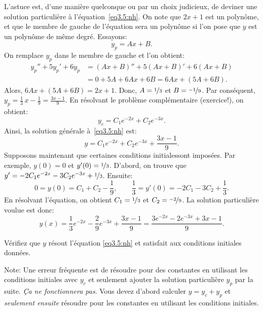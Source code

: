 L'astuce est, d'une manière quelconque ou par un choix judicieux, de deviner une solution particulière à 
l'équation~\eqref{eq3.5:nh}.  
On note que $2x+1$ est un polynôme, et que le membre de gauche de l'équation sera un polynôme si l'on pose que $y$ est un polynôme de même degré. Essayons: 
\begin{equation*}
	y_p = Ax + B .
\end{equation*}
On remplace $y_p$ dans le membre de gauche et l'on obtient: 
\begin{align*}
	y_p'' + 5y_p'+ 6y_p & = (Ax+B)'' + 5(Ax+B)' + 6(Ax+B) \\
						& = 0 + 5A + 6Ax + 6B = 6Ax+ (5A+6B) .
\end{align*}
Alors, $6Ax+(5A+6B) = 2x+1$.  
Donc, $A = \nicefrac{1}{3}$ et $B = \nicefrac{-1}{9}$.
Par conséquent, $y_p = \frac{1}{3}\, x - \frac{1}{9} = \frac{3x-1}{9}$.
En résolvant le problème complémentaire (exercice!), on obtient: 
\begin{equation*}
	y_c = C_1 e^{-2x} + C_2 e^{-3x}.
\end{equation*}
Ainsi, la solution générale à~\eqref{eq3.5:nh} est: 
\begin{equation*}
	y = C_1 e^{-2x} + C_2 e^{-3x} + \frac{3x-1}{9} .
\end{equation*}
Supposons maintenant que certaines conditions initialessont imposées. 
Par exemple,  $y(0) = 0$ et $y'(0) = \nicefrac{1}{3}$.  
D'abord, on trouve que $y' = - 2C_1 e^{-2x} - 3C_2 e^{-3x} + \nicefrac{1}{3}$.
Ensuite: 
\begin{equation*}
			0   = y(0)  = C_1 + C_2 -\frac{1}{9} , \qquad
	\frac{1}{3} = y'(0) = - 2C_1 - 3C_2 + \frac{1}{3} .
\end{equation*}
En résolvant l'équation, on obtient $C_1 = \nicefrac{1}{3}$ et $C_2 = \nicefrac{-2}{9}$.
La solution particulière voulue est donc:  
\begin{equation*}
	y(x) = \frac{1}{3} e^{-2x} - \frac{2}{9} e^{-3x} + \frac{3x-1}{9} 
		 = \frac{3 e^{-2x} - 2 e^{-3x} + 3x-1}{9} .
\end{equation*}

\begin{exercise}
	Vérifiez que $y$ résout  l'équation  \eqref{eq3.5:nh}
	et satisfait aux conditions initiales données.  
\end{exercise}

Note: Une erreur fréquente est de résoudre pour des constantes en utilisant les conditions initiales avec  $y_c$ et seulement ajouter la solution particulière $y_p$ par la suite.
 \emph{Ça ne fonctionnera pas}.  Vous devez d'abord calculer $y = y_c + y_p$ et
\emph{seulement ensuite} résoudre pour les constantes en utilisant les conditions initiales. 


